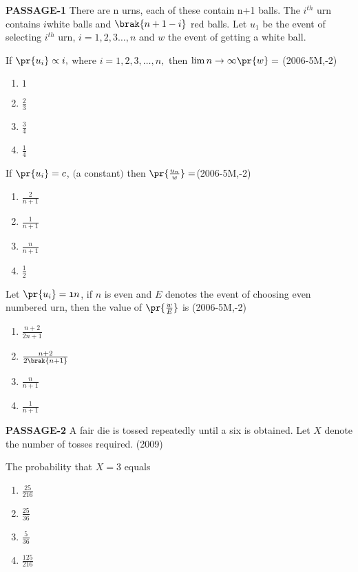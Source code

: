 \iffalse
  \title{Assignment-2}
  \author{EE24BTECH11043-Murra Rajesh Kumar Reddy}
  \section{paragraph}
\fi
\item[]
\textbf{PASSAGE-1}
There are n urns, each of these contain n+1 balls. The $i^{th}$ urn contains $i$white balls and $\brak{n+1-i}$ red balls. Let $u_1$ be the event of selecting $i^{th}$ urn, $i=1,2,3\dots,n$ and $w$ the event of getting a white ball.

	\item If $\pr{u_i}\propto i,$ where $i=1,2,3,\dots,n,$ then $\lim{n \to \infty} \pr{w}=$ \hfill(2006-5M,-2)
		\begin{enumerate}
					\item $1$
					\item $\frac{2}{3}$
					\item $\frac{3}{4}$
					\item $\frac{1}{4}$
		\end{enumerate}
	\item If $\pr{u_i}=c$, $($a constant$)$ then $\pr{\frac{u_n}{w}}=$\hfill(2006-5M,-2)
		\begin{enumerate}
				\item $\frac{2}{n+1}$
				\item $\frac{1}{n+1}$
				\item $\frac{n}{n+1}$
				\item $\frac{1}{2}$
		\end{enumerate}
	\item Let $\pr{u_i}=\frak{1}{n}$, if $n$ is even and $E$ denotes the event of choosing even numbered urn, then the value of $\pr{\frac{w}{E}}$ is \hfill(2006-5M,-2)
		\begin{enumerate}
				\item $\frac{n+2}{2n+1}$
				\item $\frac{n+2}{2\brak{n+1}}$
				\item $\frac{n}{n+1}$
				\item $\frac{1}{n+1}$
		\end{enumerate}
		\textbf{PASSAGE-2}
		A fair die is tossed repeatedly until a six is obtained. Let $X$ denote the number of tosses required. \hfill(2009)
         \item The probability that $X=3$ equals
		 \begin{enumerate}
				 \item $\frac{25}{216}$
				 \item $\frac{25}{36}$
				 \item $\frac{5}{36}$
				 \item $\frac{125}{216}$
		 \end{enumerate}
